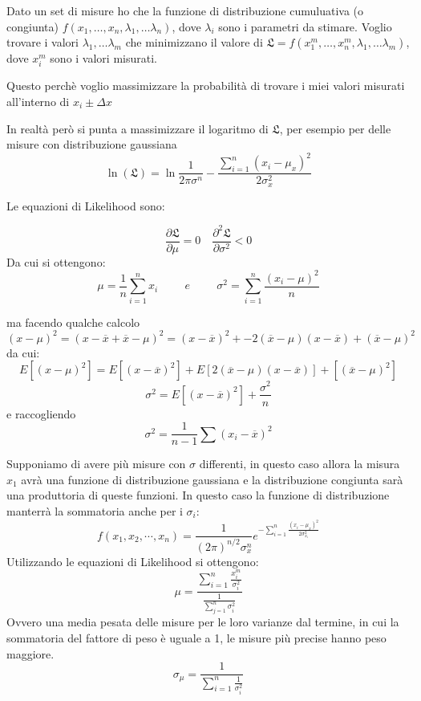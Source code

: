 \documentclass{article}
\begin{document}
Dato un set di misure ho che la funzione di distribuzione cumuluativa (o congiunta) 
$f(x_1, \dots, x_n, \lambda_1, \dots \lambda_n)$, dove $\lambda_i$ sono i parametri da stimare.
Voglio trovare i valori $\lambda_1,\dots \lambda_m$ che minimizzano il valore di $\mathfrak{L}=f(x_1^m, \dots, x_n^m, \lambda_1, \dots \lambda_m)$, dove $x_i^m$ sono i valori misurati.

Questo perchè voglio massimizzare la probabilità di trovare i miei valori misurati all'interno di $x_i \pm \Delta x$

In realtà però si punta a massimizzare il logaritmo di $\mathfrak{L}$, per esempio per delle misure con distribuzione gaussiana
\[
\ln(\mathfrak{L})= \ln\frac{1}{2\pi\sigma^n} - \frac{\sum_{i=1}^n (x_i - \mu_x)^2}{2\sigma_x^2}
\]

Le equazioni di Likelihood sono:

\[
\frac{\partial \mathfrak{L}}{\partial \mu}=0 \quad  \frac{\partial^2 \mathfrak{L}}{\partial \sigma^2}<0
\]
Da cui si ottengono: 
\[ \mu=\frac{1}{n} \sum_{i=1}^n x_i \hspace{1cm} e \hspace{1cm} \sigma^2=\sum_{i=1}^n \frac{(x_i-\mu)^2}{n} 
\]

ma facendo qualche calcolo
\[
(x-\mu)^2=(x-\overline{x}+\overline{x}-\mu)^2=(x-\overline{x})^2+-2(\overline{x}-\mu)(x-\overline{x})+(\overline{x}-\mu)^2
\]
da cui:
\[
E\left[(x-\mu)^2\right]=E\left[(x-\overline{x})^2\right]+E\left[2(\overline{x}-\mu)(x-\overline{x})\right]+\left[(\overline{x}-\mu)^2\right]
\]
\[\sigma^2=E\left[(x-\overline{x})^2\right]+\frac{\sigma^2}{n}                     
\]
e raccogliendo \[\sigma^2=\frac{1}{n-1}\sum {(x_i-\overline{x})^2}\]

Supponiamo di avere più misure con $\sigma$ differenti, in questo caso allora la misura $x_1$ avrà una funzione di distribuzione gaussiana e la distribuzione congiunta sarà una produttoria di queste funzioni.
In questo caso la funzione di distribuzione manterrà la sommatoria anche per i $\sigma_i$:
\begin{equation*}
    f(x_1, x_2, \cdots, x_n) = \frac{1}{(2\pi)^{n/2} \sigma_x^n} e^{-\sum_{i=1}^n \frac{(x_i - \mu_x)^2}{2\sigma_{x_{i}}^2}}
    \end{equation*}
Utilizzando le equazioni di Likelihood si ottengono:
\[
\mu=\frac{\sum_{i=1}^n \frac{x_i^m}{\sigma_i^2} }{\frac{1}{\sum_{j=1}^{n}\sigma_i^2}}
\]
Ovvero una media pesata delle misure per le loro varianze dal termine, in cui la sommatoria del fattore di peso è uguale a 1, le misure più precise hanno peso maggiore.
\[
\sigma_\mu=\frac{1}{\sum_{i=1}^{n}\frac{1}{\sigma_i^2}}
\]
\end{document}
